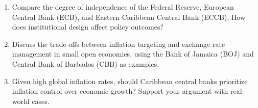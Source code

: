 \begin{enumerate}
    \begin{enumerate}
        \item Compare the degree of independence of the Federal Reserve, European Central
        Bank (ECB), and Eastern Caribbean Central Bank (ECCB). How does
        institutional design affect policy outcomes?
        
        \item Discuss the trade-offs between inflation targeting and exchange rate
        management in small open economies, using the Bank of Jamaica (BOJ) and
        Central Bank of Barbados (CBB) as examples.
        
        \item Given high global inflation rates, should Caribbean central banks prioritize
        inflation control over economic growth? Support your argument with real-world
        cases.
    \end{enumerate}

\end{enumerate}
